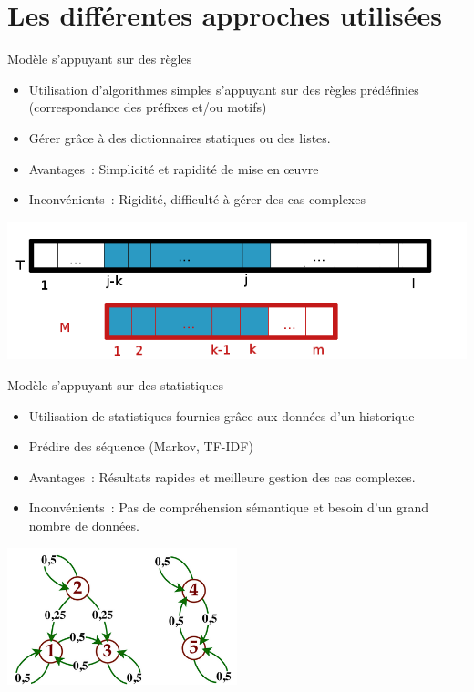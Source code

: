 \section{Les différentes approches utilisées}
\begin{frame}{Modèle s'appuyant sur des règles}
	\begin{itemize}
		\item Utilisation d'algorithmes simples s'appuyant sur des règles prédéfinies (correspondance des préfixes et/ou motifs) 
		\item Gérer grâce à des dictionnaires statiques ou des listes.
		\item Avantages~: Simplicité et rapidité de mise en œuvre
		\item Inconvénients~: Rigidité, difficulté à gérer des cas complexes
	\end{itemize}
        \begin{center}
			\includegraphics[width=\textwidth]{images/regles.png}
	\end{center}
\end{frame}

\begin{frame}{Modèle s'appuyant sur des statistiques}
	\begin{itemize}
		\item Utilisation de statistiques fournies grâce aux données d'un historique
            \item Prédire des séquence (Markov, TF-IDF)
		\item Avantages~: Résultats rapides et meilleure gestion des cas complexes.
		\item Inconvénients~: Pas de compréhension sémantique et besoin d'un grand nombre de données.
	\end{itemize}
        \begin{center}
			\includegraphics[width=0.5\textwidth]{images/statistiques.png}
	\end{center}
\end{frame}


